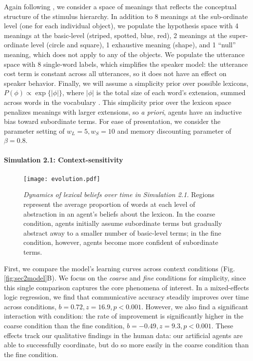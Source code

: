 Again following , we consider a space of meanings that reflects the conceptual structure of the stimulus hierarchy. 
In addition to 8 meanings at the sub-ordinate level (one for each individual object), we populate the hypothesis space with 4 meanings at the basic-level (striped, spotted, blue, red), 2 meanings at the super-ordinate level (circle and square), 1 exhaustive meaning (shape), and 1 ``null'' meaning, which does not apply to any of the objects.
We populate the utterance space with 8 single-word labels, which simplifies the speaker model: the utterance cost term is constant across all utterances, so it does not have an effect on speaker behavior.
Finally, we will assume a simplicity prior over possible lexicons, $P(\phi) \propto \exp\{|\phi|\}$, where $|\phi|$ is the total size of each word's extension, summed across words in the vocabulary \cite{FrankGoodmanTenenbaum09_Wurwur}.
This simplicity prior over the lexicon space penalizes meanings with larger extensions, so \emph{a priori}, agents have an inductive bias toward subordinate terms.
For ease of presentation, we consider the parameter setting of $w_L=5,w_S=10$ and memory discounting parameter of $\beta = 0.8$.%

\paragraph{Simulation 2.1: Context-sensitivity}

\begin{figure}[t]
\begin{center}
\texttt{[image: evolution.pdf]}
\caption{\emph{Dynamics of lexical beliefs over time in Simulation 2.1.} Regions represent the average proportion of words at each level of abstraction in an agent's beliefs about the lexicon. In the coarse condition, agents initially assume subordinate terms but gradually abstract away to a smaller number of basic-level terms; in the fine condition, however, agents become more confident of subordinate terms.}
\label{fig:evolution}
\end{center}
\end{figure}

First, we compare the model's learning curves across context conditions (Fig. \ref{fig:sec2model}B). 
We focus on the \emph{coarse} and \emph{fine} conditions for simplicity, since this single comparison captures the core phenomena of interest.
In a mixed-effects logic regression, we find that communicative accuracy steadily improves over time across conditions, $b=0.72, z = 16.9, p<0.001$.
However, we also find a significant interaction with condition: the rate of improvement is significantly higher in the coarse condition than the fine condition, $b=-0.49, z=9.3, p <0.001$. 
These effects track our qualitative findings in the human data: our artificial agents are able to successfully coordinate, but do so more easily in the coarse condition than the fine condition. 

